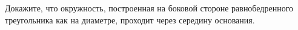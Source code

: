 \begin{ex}
	\begin{condition}
		Докажите, что окружность, построенная на боковой стороне равнобедренного треугольника как на диаметре, проходит через середину основания.
	\end{condition}
	\answer{ \(  \) }
\end{ex}